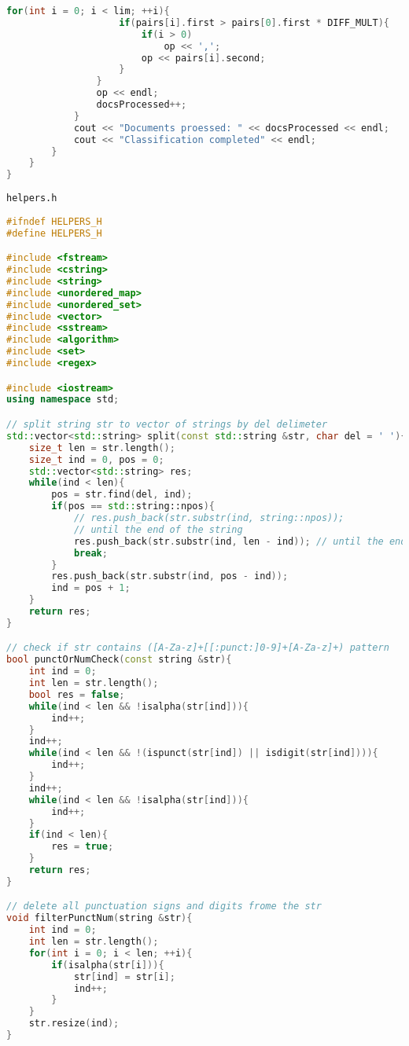 \documentclass[12pt,a4paper]{scrartcl}
\begin{document}
\begin{lstlisting}[language=C++, basicstyle=\scriptsize]
                for(int i = 0; i < lim; ++i){
                    if(pairs[i].first > pairs[0].first * DIFF_MULT){
                        if(i > 0)
                            op << ',';
                        op << pairs[i].second;
                    }
                }
                op << endl;
                docsProcessed++;
            }
            cout << "Documents proessed: " << docsProcessed << endl;
            cout << "Classification completed" << endl;
        }
    }
}
\end{lstlisting}

\verb|helpers.h|
\begin{lstlisting}[language=C++, basicstyle=\scriptsize]
#ifndef HELPERS_H
#define HELPERS_H

#include <fstream>
#include <cstring>
#include <string>
#include <unordered_map>
#include <unordered_set>
#include <vector>
#include <sstream>
#include <algorithm>
#include <set>
#include <regex>

#include <iostream>
using namespace std;

// split string str to vector of strings by del delimeter 
std::vector<std::string> split(const std::string &str, char del = ' '){
    size_t len = str.length();
    size_t ind = 0, pos = 0;
    std::vector<std::string> res;
    while(ind < len){
        pos = str.find(del, ind);
        if(pos == std::string::npos){
            // res.push_back(str.substr(ind, string::npos)); 
            // until the end of the string
            res.push_back(str.substr(ind, len - ind)); // until the end of the string
            break;
        }
        res.push_back(str.substr(ind, pos - ind));
        ind = pos + 1;
    }
    return res;
}

// check if str contains ([A-Za-z]+[[:punct:]0-9]+[A-Za-z]+) pattern
bool punctOrNumCheck(const string &str){
    int ind = 0;
    int len = str.length();
    bool res = false;
    while(ind < len && !isalpha(str[ind])){
        ind++;
    }
    ind++;
    while(ind < len && !(ispunct(str[ind]) || isdigit(str[ind]))){
        ind++;
    }
    ind++;
    while(ind < len && !isalpha(str[ind])){
        ind++;
    }
    if(ind < len){
        res = true;
    }
    return res;
}

// delete all punctuation signs and digits frome the str
void filterPunctNum(string &str){
    int ind = 0;
    int len = str.length();
    for(int i = 0; i < len; ++i){
        if(isalpha(str[i])){
            str[ind] = str[i];
            ind++;
        }
    }
    str.resize(ind);
}


\end{lstlisting}
\end{document}

